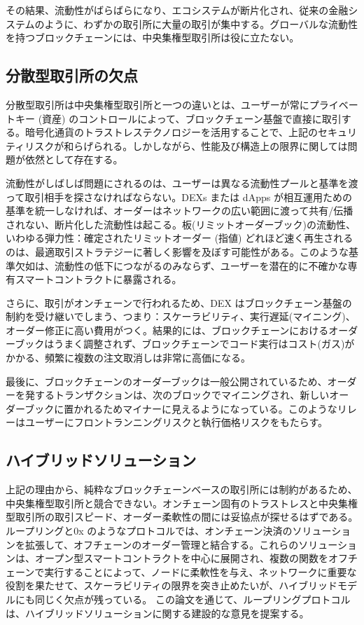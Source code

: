 \documentclass{article}
\begin{document}
\begin{multicols}{2}
その結果、流動性がばらばらになり、エコシステムが断片化され、従来の金融システムのように、わずかの取引所に大量の取引が集中する。グローバルな流動性を持つブロックチェーンには、中央集権型取引所は役に立たない。

\subsection{分散型取引所の欠点}

分散型取引所は中央集権型取引所と一つの違いとは、ユーザーが常にプライベートキー (資産) のコントロールによって、ブロックチェーン基盤で直接に取引する。暗号化通貨のトラストレステクノロジーを活用することで、上記のセキュリティリスクが和らげられる。しかしながら、性能及び構造上の限界に関しては問題が依然として存在する。

流動性がしばしば問題にされるのは、ユーザーは異なる流動性プールと基準を渡って取引相手を探さなければならない。DEXs または dApps が相互運用ための基準を統一しなければ、オーダーはネットワークの広い範囲に渡って共有/伝播されない、断片化した流動性は起こる。板(リミットオーダーブック)の流動性、いわゆる弾力性：確定されたリミットオーダー (指値) どれほど速く再生されるのは、最適取引ストラテジーに著しく影響を及ぼす可能性がある\cite{limitorderliquidity}。このような基準欠如は、流動性の低下につながるのみならず、ユーザーを潜在的に不確かな専有スマートコントラクトに暴露される。

さらに、取引がオンチェーンで行われるため、DEX はブロックチェーン基盤の制約を受け継いでしまう、つまり：スケーラビリティ、実行遅延(マイニング)、オーダー修正に高い費用がつく。結果的には、ブロックチェーンにおけるオーダーブックはうまく調整されず、ブロックチェーンでコード実行はコスト(ガス)がかかる、頻繁に複数の注文取消しは非常に高価になる。

最後に、ブロックチェーンのオーダーブックは一般公開されているため、オーダーを発するトランザクションは、次のブロックでマイニングされ、新しいオーダーブックに置かれるためマイナーに見えるようになっている。このようなリレーはユーザーにフロントランニングリスクと執行価格リスクをもたらす。

\subsection{ハイブリッドソリューション}
上記の理由から、純粋なブロックチェーンベースの取引所には制約があるため、中央集権型取引所と競合できない。オンチェーン固有のトラストレスと中央集権型取引所の取引スピード、オーダー柔軟性の間には妥協点が探せるはずである。ループリングと0x \cite{warren20170x}のようなプロトコルでは、オンチェーン決済のソリューションを拡張して、オフチェーンのオーダー管理と結合する。これらのソリューションは、オープン型スマートコントラクトを中心に展開され、複数の関数をオフチェーンで実行することによって、ノードに柔軟性を与え、ネットワークに重要な役割を果たせて、スケーラビリティの限界を突き止めたいが、ハイブリッドモデルにも同じく欠点が残っている\cite{costofdecent}。 この論文を通じて、ループリングプロトコルは、ハイブリッドソリューションに関する建設的な意見を提案する。


\end{multicols}
\end{document}
